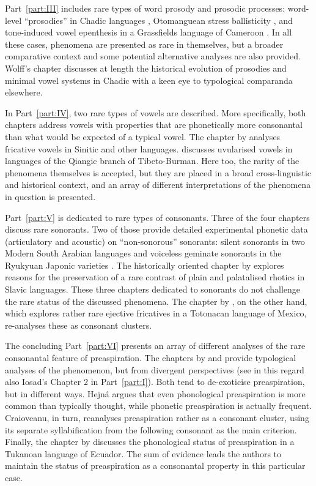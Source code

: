 \documentclass[output=paper]{langscibook}
\begin{document}
Part~\ref{part:III} includes rare types of word prosody and prosodic processes: word-level “prosodies” in Chadic languages , Otomanguean stress ballisticity , and tone-induced vowel epenthesis in a Grassfields language of Cameroon . In all these cases, phenomena are presented as rare in themselves, but a broader comparative context and some potential alternative analyses are also provided. Wolff’s chapter discusses at length the historical evolution of prosodies and minimal vowel systems in Chadic with a keen eye to typological comparanda elsewhere.

In Part~\ref{part:IV}, two rare types of vowels are described. More specifically, both chapters address vowels with properties that are phonetically more consonantal than what would be expected of a typical vowel. The chapter by  analyses fricative vowels in Sinitic and other languages.  discusses uvularised vowels in languages of the Qiangic branch of Tibeto-Burman. Here too, the rarity of the phenomena themselves is accepted, but they are placed in a broad cross-linguistic and historical context, and an array of different interpretations of the phenomena in question is presented.

Part~\ref{part:V} is dedicated to rare types of consonants. Three of the four chapters discuss rare sonorants. Two of those provide detailed experimental phonetic data (articulatory and acoustic) on “non-sonorous” sonorants: silent sonorants in two Modern South Arabian languages  and voiceless geminate sonorants in the Ryukyuan Japonic varieties . The historically oriented chapter by   explores reasons for the preservation of a rare contrast of plain and palatalised rhotics in Slavic languages. These three chapters dedicated to sonorants do not challenge the rare status of the discussed phenomena. The chapter by , on the other hand, which explores rather rare ejective fricatives in a Totonacan language of Mexico, re-analyses these as consonant clusters.

The concluding Part~\ref{part:VI} presents an array of different analyses of the rare consonantal feature of preaspiration. The chapters by  and  provide typological analyses of the phenomenon, but from divergent perspectives (see in this regard also Iosad’s Chapter 2 in Part~\ref{part:I}). Both tend to de-exoticise preaspiration, but in different ways. Hejná argues that even phonological preaspiration is more common than typically thought, while phonetic preaspiration is actually frequent. Craioveanu, in turn, reanalyses preaspiration rather as a consonant cluster, using its separate syllabification from the following consonant as the main criterion. Finally, the chapter by  discusses the phonological status of preaspiration in a Tukanoan language of Ecuador. The sum of evidence leads the authors to maintain the status of preaspiration as a consonantal property in this particular case.
\end{document}
